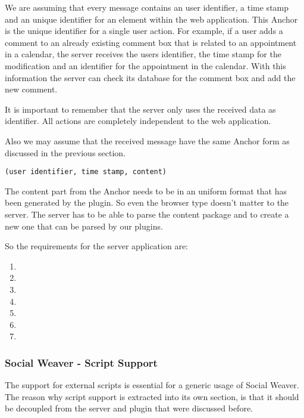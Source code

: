 We are assuming that every message contains an user identifier, a time stamp and an unique identifier for an element within the web application. This Anchor is the unique identifier for a single user action. For example, if a user adds a comment to an already existing comment box that is related to an appointment in a calendar, the server receives the users identifier, the time stamp for the modification and an identifier for the appointment in the calendar. With this information the server can check its database for the comment box and add the new comment. 

It is important to remember that the server only uses the received data as identifier. All actions are completely independent to the web application. 

Also we may assume that the received message have the same Anchor form as discussed in the previous section. 
\begin{verbatim}(user identifier, time stamp, content)\end{verbatim} 
The content part from the Anchor needs to be in an uniform format that has been generated by the plugin. So even the browser type doesn't matter to the server. The server has to be able to parse the content package and to create a new one that can be parsed by our plugins.

So the requirements for the server application are:
\begin{enumerate}
\item \reqWSi
\item \reqWSii
\item \reqWSiii
\item \reqWSiv
\item \reqWSv
\item \reqWSvi
\item \reqWSvii
\end{enumerate}

\subsubsection{Social Weaver - Script Support} \label{abstract-script-support-reqs}
The support for external scripts is essential for a generic usage of Social Weaver. The reason why script support is extracted into its own section, is that it should be decoupled from the server and plugin that were discussed before. 

